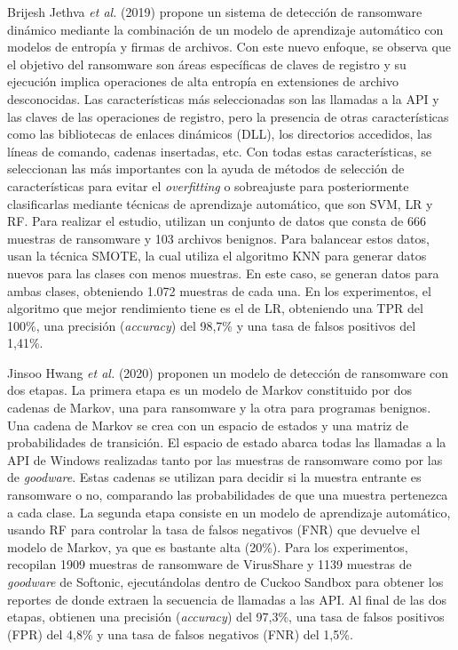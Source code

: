 Brijesh Jethva \textit{et al.} (2019) \cite{entropy} propone un sistema de detección de ransomware dinámico mediante la combinación de un modelo de aprendizaje automático con modelos de entropía y firmas de archivos. Con este nuevo enfoque, se observa que el objetivo del ransomware son áreas específicas de claves de registro y su ejecución implica operaciones de alta entropía en extensiones de archivo desconocidas. Las características más seleccionadas son las llamadas a la \gls{API} y las claves de las operaciones de registro, pero la presencia de otras características como las bibliotecas de enlaces dinámicos (\gls{DLL}), los directorios accedidos, las líneas de comando, cadenas insertadas, etc. Con todas estas características, se seleccionan las más importantes con la ayuda de métodos de selección de características para evitar el \textit{overfitting} o sobreajuste para posteriormente clasificarlas mediante técnicas de aprendizaje automático, que son \gls{SVM}, \gls{LR} y \gls{RF}. Para realizar el estudio, utilizan un conjunto de datos que consta de 666 muestras de ransomware y 103 archivos benignos. Para balancear estos datos, usan la técnica \gls{SMOTE}, la cual utiliza el algoritmo \gls{KNN} para generar datos nuevos para las clases con menos muestras. En este caso, se generan datos para ambas clases, obteniendo 1.072 muestras de cada una. En los experimentos, el algoritmo que mejor rendimiento tiene es el de \gls{LR}, obteniendo una \gls{TPR} del 100\%, una precisión (\textit{accuracy}) del 98,7\% y una tasa de falsos positivos del 1,41\%.


Jinsoo Hwang \textit{et al.} (2020) \cite{two} proponen un modelo de detección de ransomware con dos etapas. La primera etapa es un modelo de Markov constituido por dos cadenas de Markov, una para ransomware y la otra para programas benignos. Una cadena de Markov se crea con un espacio de estados y una matriz de probabilidades de transición. El espacio de estado abarca todas las llamadas a la \gls{API} de Windows realizadas tanto por las muestras de ransomware como por las de \textit{goodware}. Estas cadenas se utilizan para decidir si la muestra entrante es ransomware o no, comparando las probabilidades de que una muestra pertenezca a cada clase. La segunda etapa consiste en un modelo de aprendizaje automático, usando \gls{RF} para controlar la tasa de falsos negativos (\gls{FNR}) que devuelve el modelo de Markov, ya que es bastante alta (20\%). Para los experimentos, recopilan 1909 muestras de ransomware de VirusShare y 1139 muestras de \textit{goodware} de Softonic, ejecutándolas dentro de Cuckoo Sandbox para obtener los reportes de donde extraen la secuencia de llamadas a las \gls{API}. Al final de las dos etapas, obtienen una precisión (\textit{accuracy}) del 97,3\%, una tasa de falsos positivos (\gls{FPR}) del 4,8\% y una tasa de falsos negativos (\gls{FNR}) del 1,5\%.


